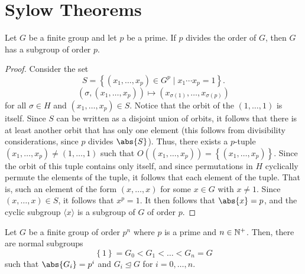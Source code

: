 \section{Sylow Theorems}

\begin{theorem} \label{thm:cauchy}
    Let $G$ be a finite group and let $p$ be a prime. If $p$ divides the order of $G$, then $G$ has a subgroup of order $p$. 
\end{theorem}
\begin{proof}
    Consider the set
    \[
        S = \left\{ (x_1, \ldots , x_p) \in G^p \mid x_1 \cdots x_p = 1 \right\}.
    \]
    \[
        \left( \sigma, (x_1, \ldots, x_p) \right) \longmapsto \left( x_{\sigma(1)}, \ldots, x_{\sigma(p)} \right)
    \]
    for all $\sigma \in H$ and  $(x_1, \ldots, x_p) \in S$. Notice that the orbit of the $(1, \ldots, 1)$ is itself. Since $S$ can be written as a disjoint union of orbits, it follows that there is at least another orbit that has only one element (this follows from divisibility considerations, since $p$ divides $\abs{S}$). Thus, there exists a $p$-tuple $(x_1, \ldots, x_p) \neq (1, \ldots, 1)$ such that $O((x_1, \ldots, x_p)) = \left\{ (x_1, \ldots, x_p) \right\}$. Since the orbit of this tuple contains only itself, and since permutations in $H$ cyclically permute the elements of the tuple, it follows that each element of the tuple. That is, such an element of the form $(x, \ldots, x)$ for some $x \in G$ with $x \neq 1$. Since $(x, \ldots, x) \in S$, it follows that $x^p = 1$. It then follows that $\abs{x} = p$, and the cyclic subgroup $\langle x \rangle$ is a subgroup of $G$ of order $p$. 
\end{proof}

\begin{prop} \label{prop:p^n-has-normal-subgroups-p^i}
    Let $G$ be a finite group of order $p^n$ where $p$ is a prime and $n \in \mathbb{N}^+$. Then, there are normal subgroups
    \[
        \left\{ 1 \right\} = G_0 < G_1 < \ldots < G_n = G
    \]
    such that $\abs{G_i} = p^i$ and $G_i \trianglelefteq G$ for $i = 0, \ldots, n$.
\end{prop}

